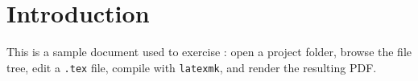\section{Introduction}

This is a sample document used to exercise \huxley{}: open a project folder,
browse the file tree, edit a \texttt{.tex} file, compile with \texttt{latexmk},
and render the resulting PDF.

